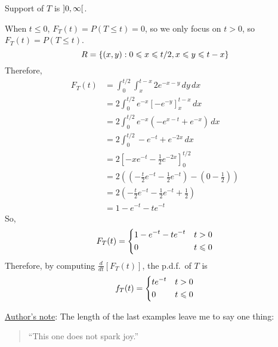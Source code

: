 \begin{Example}{}{}
\begin{enumerate}[label=(\roman*)]
              Support of $ T $ is $ \interval[open]{0}{\infty} $.

              When $ t\leqslant 0 $, $ F_T(t)=P(T\leqslant t)=0 $,
              so we only focus on $ t>0 $, so $ F_T(t)=P(T\leqslant t) $.
              \[ R=\{(x,y):0\leqslant x\leqslant t/2, x\leqslant y\leqslant t-x\} \]
              Therefore,
              \begin{align*}
                  F_T(t)
                   & = \int_{0}^{t/2} \int_{x}^{t-x} 2e^{-x-y}\, d{y} \, d{x}             \\
                   & =2 \int_{0}^{t/2} e^{-x}\left[ -e^{-y} \right]_x^{t-x}\, d{x}        \\
                   & =2 \int_{0}^{t/2} e^{-x}\left( -e^{x-t}+e^{-x} \right)\, d{x}        \\
                   & =2 \int_{0}^{t/2} -e^{-t}+e^{-2x}\, d{x}                             \\
                   & =2\left[ -xe^{-t}-\frac{1}{2}e^{-2x} \right]_0^{t/2}                 \\
                   & =2\left( \left( -\frac{t}{2} e^{-t} -\frac{1}{2} e^{-t}\right)
                  -\left( 0-\frac{1}{2}  \right) \right)                                  \\
                   & =2\left( -\frac{t}{2} e^{-t}-\frac{1}{2} e^{-t}+\frac{1}{2}  \right) \\
                   & =1-e^{-t}-te^{-t}
              \end{align*}
              So,
              \[ F_T(t)=
                  \begin{dcases}
                      1-e^{-t}-te^{-t} & t>0          \\
                      0                & t\leqslant 0
                  \end{dcases} \]
              Therefore, by computing $ \displaystyle
                  \frac{d}{dt}[F_T(t)] $, the p.d.f.\ of $ T $ is
              \[ f_T(t)=
                  \begin{dcases}
                      te^{-t} & t> 0         \\
                      0       & t\leqslant 0
                  \end{dcases} \]
    \end{enumerate}
\end{Example}
\underline{Author's note}: The length of the last examples leave me to say one thing:
\begin{quote}
    ``This one does not spark joy.''
\end{quote}
